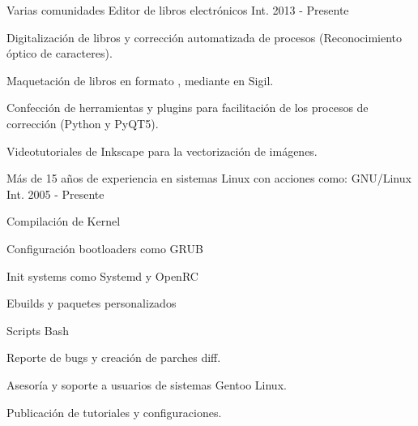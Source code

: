 


\begin{cventries}

  \cventry
    {Varias comunidades} %
    {Editor de libros electrónicos} %
    {Int.} %
    {2013 - Presente} %
    {
      \begin{cvitems} %
        \item {Digitalización de libros y corrección automatizada de procesos  (Reconocimiento óptico de caracteres).}
        \item {Maquetación de libros en formato ,  mediante  en Sigil.}
        \item {Confección de herramientas y plugins para facilitación de los procesos de corrección (Python y PyQT5).}
        \item {Videotutoriales de Inkscape para la vectorización de imágenes.}
      \end{cvitems}
    }

  \cventry
    {Más de 15 años de experiencia en sistemas Linux con acciones como:} %
    {GNU/Linux} %
    {Int.} %
    {2005 - Presente} %
    {
      \begin{cvitems} %
        \item {Compilación de Kernel}
        \item {Configuración bootloaders como GRUB}
        \item {Init systems como Systemd y OpenRC}
        \item {Ebuilds y paquetes personalizados}
        \item {Scripts Bash}
        \item {Reporte de bugs y creación de parches diff.}
        \item {Asesoría y soporte a usuarios de sistemas Gentoo Linux.}
        \item {Publicación de tutoriales y configuraciones.}
      \end{cvitems}
    }

\end{cventries}

